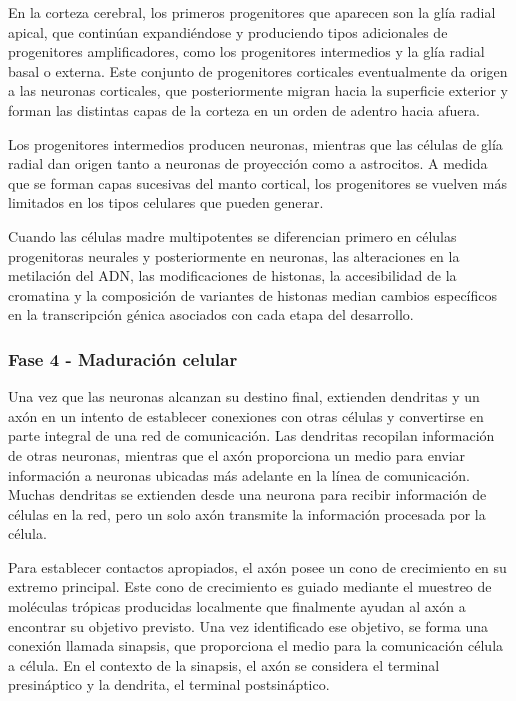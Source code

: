 \documentclass[11pt,letterpaper]{report}
\begin{document}
En la corteza cerebral, los primeros progenitores que aparecen son la glía
radial apical, que continúan expandiéndose y produciendo tipos adicionales de
progenitores amplificadores, como los progenitores intermedios y la glía radial
basal o externa. Este conjunto de progenitores corticales eventualmente da
origen a las neuronas corticales, que posteriormente migran hacia la superficie
exterior y forman las distintas capas de la corteza en un orden de adentro
hacia afuera. \cite{Lindhout2024}

Los progenitores intermedios producen neuronas, mientras que las células de
glía radial dan origen tanto a neuronas de proyección como a astrocitos. A
medida que se forman capas sucesivas del manto cortical, los progenitores se
vuelven más limitados en los tipos celulares que pueden generar.
\cite{Lindhout2024}

Cuando las células madre multipotentes se diferencian primero en células
progenitoras neurales y posteriormente en neuronas, las alteraciones en la
metilación del ADN, las modificaciones de histonas, la accesibilidad de la
cromatina y la composición de variantes de histonas median cambios específicos
en la transcripción génica asociados con cada etapa del desarrollo.
\cite{Lindhout2024}

\subsubsection{Fase 4 - Maduración celular}
Una vez que las neuronas alcanzan su destino final, extienden dendritas y un
axón en un intento de establecer conexiones con otras células y convertirse en
parte integral de una red de comunicación. Las dendritas recopilan información
de otras neuronas, mientras que el axón proporciona un medio para enviar
información a neuronas ubicadas más adelante en la línea de comunicación.
Muchas dendritas se extienden desde una neurona para recibir información de
células en la red, pero un solo axón transmite la información procesada por la
célula. \cite{Gibb2018}

Para establecer contactos apropiados, el axón posee un cono de crecimiento en
su extremo principal. Este cono de crecimiento es guiado mediante el muestreo
de moléculas trópicas producidas localmente que finalmente ayudan al axón a
encontrar su objetivo previsto. Una vez identificado ese objetivo, se forma una
conexión llamada sinapsis, que proporciona el medio para la comunicación célula
a célula. En el contexto de la sinapsis, el axón se considera el terminal
presináptico y la dendrita, el terminal postsináptico. \cite{Gibb2018}
\end{document}
